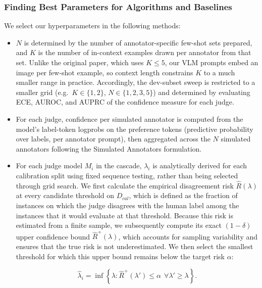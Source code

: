 \documentclass[11pt,a4paper]{article}
\begin{document}
 
\subsubsection{Finding Best Parameters for Algorithms and Baselines}
 
We select our hyperparameters in the following methods:
 
\begin{itemize}[leftmargin=*]
  \item  $N$ is determined by the number of
        annotator-specific few-shot sets prepared, and $K$ is the
        number of in-context examples drawn per annotator from that set. Unlike the original
        paper, which uses $K \le 5$, our VLM prompts embed an image per few-shot example, so context length constrains $K$ to a much smaller range in practice. Accordingly, the dev-subset sweep is restricted to a smaller grid
        (e.g.\ $K \in \{1,2\}$, $N \in \{1,2,3,5\}$) and determined by evaluating ECE, AUROC, and
        AUPRC of the confidence measure for each judge.
\item For each judge, confidence per simulated annotator is
        computed from the model's label-token logprobs on the preference tokens (predictive probability over labels, per annotator prompt), then aggregated across the $N$ simulated
        annotators following the Simulated Annotators formulation.
  \item For each judge model $M_i$ in the cascade, $\lambda_i$ is analytically derived for each calibration split using fixed sequence testing, rather than being selected through grid search. We first calculate the empirical disagreement risk $\widehat{R}(\lambda)$ at every candidate threshold on $D_{cal}$, which is defined as the fraction of instances on which the judge disagrees with the human label among the instances that it would evaluate at that threshold. Because this risk is estimated from a finite sample, we subsequently compute its exact $(1-\delta)$ upper confidence bound $\widehat{R}^{+}(\lambda)$, which accounts for sampling variability and ensures that the true risk is not underestimated. We then select the smallest threshold for which this upper bound remains below the target risk $\alpha$:

\[
        \widehat{\lambda}_i = \inf\left\{\lambda : \widehat{R}^{+}(\lambda') \le \alpha \ \ \forall \lambda' \ge \lambda\right\}.
      \]


\end{itemize}
\end{document}
